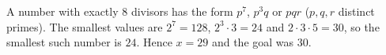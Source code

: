 A number with exactly $8$ divisors has the form $p^7$, $p^3q$ or $pqr$ ($p,q,r$ distinct primes). The smallest values are $2^7=128$, $2^3\cdot3=24$ and $2\cdot3\cdot5=30$, so the smallest such number is $24$. Hence $x=29$ and the goal was $\boxed{30}$.
